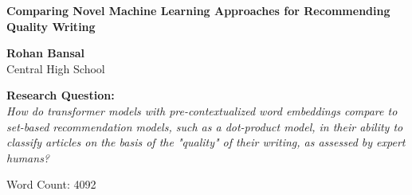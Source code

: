 \begin{titlepage}
    \begin{center}
        \vspace*{1cm}
            
        \huge
        \textbf{Comparing Novel Machine Learning Approaches for Recommending Quality Writing}
            
        \vspace{0.5cm}

        \vspace{1.5cm}
        
        \large
        \textbf{Rohan Bansal} \\
        Central High School
            
        \vfill
        
        \Large
        \textbf{Research Question: } \\
        \large
        \emph{How do transformer models with pre-contextualized word embeddings compare to set-based recommendation models, such as a dot-product model, in their ability to classify articles on the basis of the "quality" of their writing, as assessed by expert humans?}
            
        \vspace{0.8cm}
            
        \Large
        Word Count: 4092
            
    \end{center}
\end{titlepage}